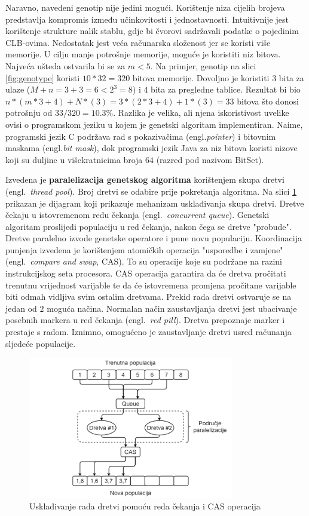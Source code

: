 \documentclass[times, utf8, diplomski]{fer}
\begin{document}
Naravno, navedeni genotip nije jedini mogući. Korištenje niza cijelih brojeva predstavlja kompromis između učinkovitosti i jednostavnosti. Intuitivnije jest korištenje strukture nalik stablu, gdje bi čvorovi sadržavali podatke o pojedinim CLB-ovima. Nedostatak jest veća računarska složenost jer se koristi više memorije. U cilju manje potrošnje memorije, moguće je koristiti niz bitova. Najveća ušteda ostvarila bi se za $m<5$. Na primjer, genotip na slici \ref{fig:genotype} koristi $10*32=320$ bitova memorije. Dovoljno je koristiti $3$ bita za ulaze ($M+n=3+3=6<2^{3}=8$) i $4$ bita za pregledne tablice. Rezultat bi bio $n*(m*3+4)+N*(3)=3*(2*3+4)+1*(3)=33$ bitova što donosi potrošnju od $33/320=10.3\%$. Razlika je velika, ali njena iskoristivost uvelike ovisi o programskom jeziku u kojem je genetski algoritam implementiran. Naime, programski jezik C podržava rad s pokazivačima (engl.\textit{pointer}) i bitovnim maskama (engl.\textit{bit mask}), dok programski jezik Java za niz bitova koristi nizove koji su duljine u višekratnicima broja $64$ (razred pod nazivom BitSet).

Izvedena je \textbf{paralelizacija genetskog algoritma} korištenjem skupa dretvi (engl.~\textit{thread pool}). Broj dretvi se odabire prije pokretanja algoritma. Na slici \ref{fig:threads} prikazan je dijagram koji prikazuje mehanizam usklađivanja skupa dretvi. Dretve čekaju u istovremenom redu čekanja (engl.~\textit{concurrent queue}). Genetski algoritam proslijedi populaciju u red čekanja, nakon čega se dretve "probude". Dretve paralelno izvode genetske operatore i pune novu populaciju. Koordinacija punjenja izvedena je korištenjem atomičkih operacija "usporedbe i zamjene" (engl.~\textit{compare and swap}, CAS). To su operacije koje su podržane na razini instrukcijskog seta procesora. CAS operacija garantira da će dretva pročitati trenutnu vrijednost varijable te da će istovremena promjena pročitane varijable biti odmah vidljiva svim ostalim dretvama. Prekid rada dretvi ostvaruje se na jedan od $2$ moguća načina. Normalan način zaustavljanja dretvi jest ubacivanje posebnih markera u red čekanja (engl.~\textit{red pill}). Dretva prepoznaje marker i prestaje s radom. Iznimno, omogućeno je zaustavljanje dretvi usred računanja sljedeće populacije.

\begin{figure}[htb]
	\centering
	\includegraphics[width=0.8\textwidth]{img/threads.png}
	\caption{Usklađivanje rada dretvi pomoću reda čekanja i CAS operacija}
	\label{fig:threads}
\end{figure}
\end{document}
